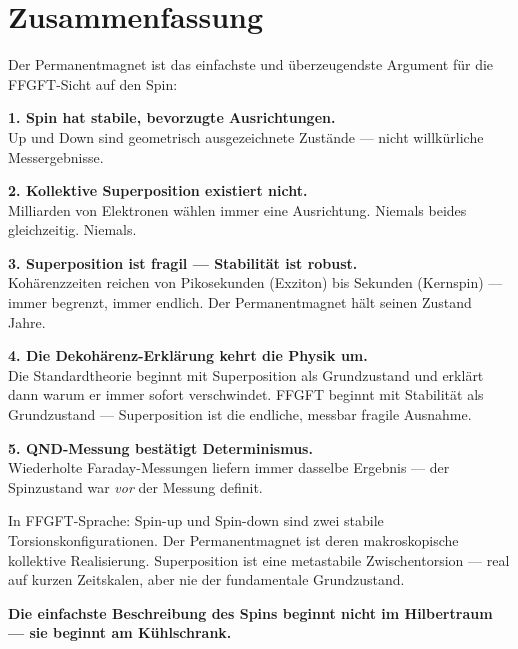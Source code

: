 \section{Zusammenfassung}
\label{sec:zusammenfassung-178}

\begin{conclusionBox}
Der Permanentmagnet ist das einfachste und überzeugendste
Argument für die FFGFT-Sicht auf den Spin:

\textbf{1. Spin hat stabile, bevorzugte Ausrichtungen.}\\
Up und Down sind geometrisch ausgezeichnete Zustände ---
nicht willkürliche Messergebnisse.

\textbf{2. Kollektive Superposition existiert nicht.}\\
Milliarden von Elektronen wählen immer eine Ausrichtung.
Niemals beides gleichzeitig. Niemals.

\textbf{3. Superposition ist fragil --- Stabilität ist robust.}\\
Kohärenzzeiten reichen von Pikosekunden (Exziton) bis
Sekunden (Kernspin) --- immer begrenzt, immer endlich.
Der Permanentmagnet hält seinen Zustand Jahre.

\textbf{4. Die Dekohärenz-Erklärung kehrt die Physik um.}\\
Die Standardtheorie beginnt mit Superposition als Grundzustand
und erklärt dann warum er immer sofort verschwindet.
FFGFT beginnt mit Stabilität als Grundzustand ---
Superposition ist die endliche, messbar fragile Ausnahme.

\textbf{5. QND-Messung bestätigt Determinismus.}\\
Wiederholte Faraday-Messungen liefern immer dasselbe Ergebnis ---
der Spinzustand war \emph{vor} der Messung definit.

In FFGFT-Sprache:
Spin-up und Spin-down sind zwei stabile Torsionskonfigurationen.
Der Permanentmagnet ist deren makroskopische kollektive Realisierung.
Superposition ist eine metastabile Zwischentorsion ---
real auf kurzen Zeitskalen, aber nie der fundamentale Grundzustand.

\textbf{Die einfachste Beschreibung des Spins beginnt nicht im
Hilbertraum --- sie beginnt am Kühlschrank.}
\end{conclusionBox}


